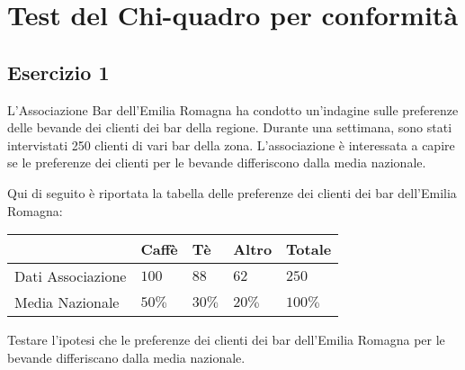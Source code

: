 \documentclass[
  11pt,
]{book}
\theoremstyle{mytheoremstyle}
\theoremstyle{mydefstyle}
\begin{document}
\chapter{Test del Chi-quadro per conformità}\label{test-del-chi-quadro-per-conformituxe0}

\section{Esercizio 1}\label{esercizio-1-2}

L'Associazione Bar dell'Emilia Romagna ha condotto un'indagine sulle preferenze delle bevande dei clienti dei bar della regione. Durante una settimana, sono stati intervistati 250 clienti di vari bar della zona. L'associazione è interessata a capire se le preferenze dei clienti per le bevande differiscono dalla media nazionale.

Qui di seguito è riportata la tabella delle preferenze dei clienti dei bar dell'Emilia Romagna:

\begin{table}[H]
\centering
\begin{tabular}{lllll}
\toprule
  & Caffè & Tè & Altro & Totale\\
\midrule
Dati Associazione & $100$ & $88$ & $62$ & $250$\\
Media Nazionale & $50\%$ & $30\%$ & $20\%$ & $100\%$\\
\bottomrule
\end{tabular}
\end{table}

Testare l'ipotesi che le preferenze dei clienti dei bar dell'Emilia Romagna per le bevande differiscano dalla media nazionale.
\end{document}
